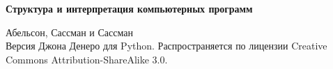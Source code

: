 \begin{titlepage}
    \centering
    \vspace*{\fill}

    \vspace*{0.5cm}

    \huge\bfseries
   Структура и интерпретация компьютерных программ 

    \vspace*{0.5cm}

    \large Абельсон, Сассман и Сассман
    \\
    \large Версия Джона Денеро для Python. Распространяется по лицензии Creative Commons Attribution-ShareAlike 3.0.

    \vspace*{\fill}
    \end{titlepage}
